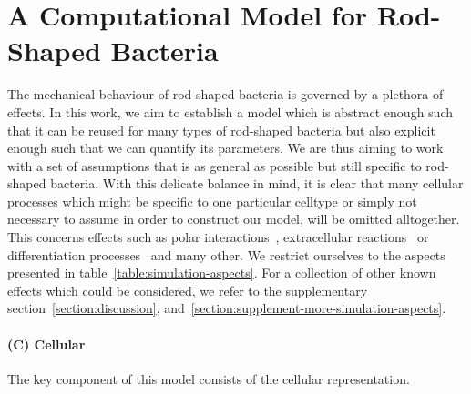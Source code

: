 \documentclass{article}
\begin{document}
\section{A Computational Model for Rod-Shaped Bacteria}
\label{sec:computational-model}

The mechanical behaviour of rod-shaped bacteria is governed by a plethora of effects.
In this work, we aim to establish a model which is abstract enough such that it can be reused for
many types of rod-shaped bacteria but also explicit enough such that we can quantify its parameters.
We are thus aiming to work with a set of assumptions that is as general as possible but still
specific to rod-shaped bacteria.
With this delicate balance in mind, it is clear that many cellular processes which might be specific
to one particular celltype or simply not necessary to assume in order to construct our model, will
be omitted alltogether.
This concerns effects such as polar interactions~\cite{Duvernoy2018}, extracellular
reactions~\cite{Wang2010} or differentiation processes~\cite{vanGestel2015,Lpez2010} and many other.
We restrict ourselves to the aspects presented in table~\ref{table:simulation-aspects}.
For a collection of other known effects which could be considered, we refer to the supplementary
section~\ref{section:discussion}, and~\ref{section:supplement-more-simulation-aspects}.

\paragraph{(C) Cellular}
The key component of this model consists of the cellular representation.
\end{document}
